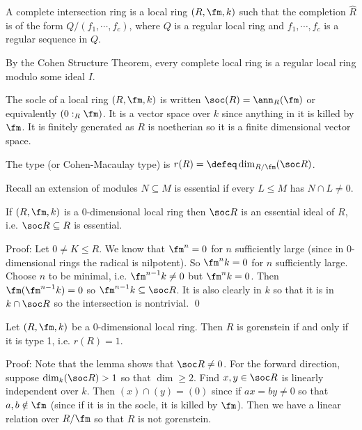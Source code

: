 \begin{dfn}
A complete intersection ring is a local ring $(R,\fm,k)$ such that the completion $\hat{R}$ is of the form $Q/(f_1,\cdots,f_c)$, where $Q$ is a regular local ring and $f_1,\cdots,f_c$ is a regular sequence in $Q$. 
\end{dfn}

\begin{rem}
By the Cohen Structure Theorem, every complete local ring is a regular local ring modulo some ideal $I$.
\end{rem}

\begin{dfn}[Socle]
The socle of a local ring $(R,\fm,k)$ is written $\soc(R)=\ann_R(\fm)$ or equivalently $(0:_R \fm)$. It is a vector space over $k$ since anything in it is killed by $\fm$. It is finitely generated as $R$ is noetherian so it is a finite dimensional vector space.
\end{dfn}

\begin{dfn}[Type]
The type (or Cohen-Macaulay type) is $r(R)=\defeq \dim_{R/\fm}(\soc R)$.
\end{dfn}

 Recall an extension of modules $N \subseteq M$ is essential if every $L \leq M$ has $N \cap L \neq 0$. 
 
 \begin{lem}
 If $(R,\fm,k)$ is a 0-dimensional local ring then $\soc R$ is an essential ideal of $R$, i.e. $\soc R \subseteq R$ is essential. 
 \end{lem}
 
 \noindent Proof: Let $0 \neq K \leq R$. We know that $\fm^n=0$ for $n$ sufficiently large (since in 0-dimensional rings the radical is nilpotent). So $\fm^nk=0$ for $n$ sufficiently large. Choose $n$ to be minimal, i.e. $\fm^{n-1}k \neq 0$ but $\fm^nk=0$. Then $\fm(\fm^{n-1}k)=0$ so $\fm^{n-1}k \subseteq \soc R$. It is also clearly in $k$ so that it is in $k \cap \soc R$ so the intersection is nontrivial. \qed \\

\begin{prop}
Let $(R,\fm,k)$ be a 0-dimensional local ring. Then $R$ is gorenstein if and only if it is type 1, i.e. $r(R)=1$.
\end{prop}

\noindent Proof: Note that the lemma shows that $\soc R \neq 0$. For the forward direction, suppose $\dim_k(\soc R)>1$ so that $\dim \geq 2$. Find $x,y \in \soc R$ is linearly independent over $k$. Then $(x) \cap (y)=(0)$ since if $ax=by \neq 0$ so that $a,b \notin \fm$ (since if it is in the socle, it is killed by $\fm$). Then we have a linear relation over $R/\fm$ so that $R$ is not gorenstein. 

